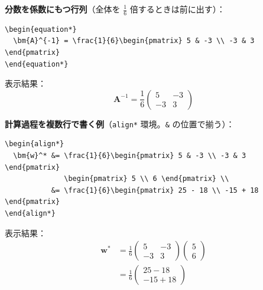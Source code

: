 \documentclass[a4paper,dvipdfmx]{jsarticle}
\newcommand{\提出期限}{2026年10月26日（月）}
\newcommand{\学籍番号}{0000000}
\newcommand{\氏名}{氏名を書く}
\newcommand{\提出日}{2026年10月26日}
\begin{document}
\noindent
\textbf{分数を係数にもつ行列}（全体を $\frac{1}{6}$ 倍するときは前に出す）：
\begin{verbatim}
\begin{equation*}
  \bm{A}^{-1} = \frac{1}{6}\begin{pmatrix} 5 & -3 \\ -3 & 3 \end{pmatrix}
\end{equation*}
\end{verbatim}
表示結果：
\begin{equation*}
  \bm{A}^{-1} = \frac{1}{6}\begin{pmatrix} 5 & -3 \\ -3 & 3 \end{pmatrix}
\end{equation*}

\noindent
\textbf{計算過程を複数行で書く例}（\verb|align*| 環境。\verb|&| の位置で揃う）：
\begin{verbatim}
\begin{align*}
  \bm{w}^* &= \frac{1}{6}\begin{pmatrix} 5 & -3 \\ -3 & 3 \end{pmatrix}
              \begin{pmatrix} 5 \\ 6 \end{pmatrix} \\
           &= \frac{1}{6}\begin{pmatrix} 25 - 18 \\ -15 + 18 \end{pmatrix}
\end{align*}
\end{verbatim}
表示結果：
\begin{align*}
  \bm{w}^* &= \frac{1}{6}\begin{pmatrix} 5 & -3 \\ -3 & 3 \end{pmatrix}
              \begin{pmatrix} 5 \\ 6 \end{pmatrix} \\
           &= \frac{1}{6}\begin{pmatrix} 25 - 18 \\ -15 + 18 \end{pmatrix}
\end{align*}
\end{document}
